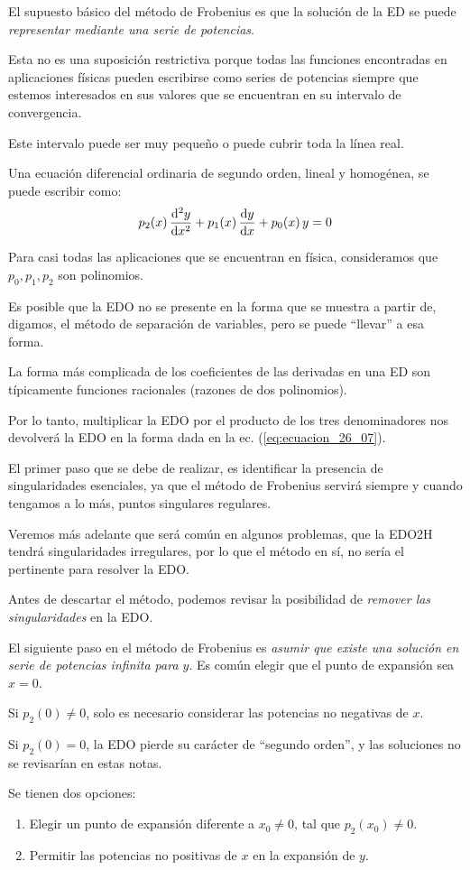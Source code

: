 El supuesto básico del método de Frobenius es que la solución de la ED se puede \emph{representar mediante una serie de potencias}.
\par
Esta no es una suposición restrictiva porque todas las funciones encontradas en aplicaciones físicas pueden escribirse como series de potencias siempre que estemos interesados en sus valores que se encuentran en su intervalo de convergencia.
\par
Este intervalo puede ser muy pequeño o puede cubrir toda la línea real.
\par
Una ecuación diferencial ordinaria de segundo orden, lineal y  homogénea, se puede escribir como:
\begin{align}
p_{2} (x) \, \dv[2]{y}{x} + p_{1} (x) \, \dv{y}{x} + p_{0}(x) \, y = 0
\label{eq:ecuacion_26_07}    
\end{align}

Para casi todas las aplicaciones que se encuentran en física, consideramos que $p_{0}, p_{1}, p_{2}$ son polinomios.
\par
Es posible que la EDO no se presente en la forma que se muestra a partir de, digamos, el método de separación de variables, pero se puede \enquote{llevar} a esa forma.
\par
La forma más complicada de los coeficientes de las derivadas en una ED son típicamente funciones racionales (razones de dos polinomios).
\par
Por lo tanto, multiplicar la EDO por el producto de los tres denominadores nos devolverá la EDO en la forma dada en la ec. (\ref{eq:ecuacion_26_07}).
\par
El primer paso que se debe de realizar, es identificar la presencia de singularidades esenciales, ya que el método de Frobenius servirá siempre y cuando tengamos a lo más, puntos singulares regulares.
\par
Veremos más adelante que será común en algunos problemas, que la EDO2H tendrá singularidades irregulares, por lo que el método en sí, no sería el pertinente para resolver la EDO.
\par
Antes de descartar el método, podemos revisar la posibilidad de \emph{remover las singularidades} en la EDO.
\par
El siguiente paso en el método de Frobenius es \emph{asumir que existe una solución en serie de potencias infinita para $y$}. Es común elegir que el punto de expansión sea $x = 0$.
\par
Si $p_{2} (0) \neq 0$, solo es necesario considerar las potencias no negativas de $x$.
\par
Si $p_{2} (0) = 0$, la EDO pierde su carácter de \enquote{segundo orden}, y las soluciones no se revisarían en estas notas.
\par
Se tienen dos opciones:
\begin{enumerate}
\item Elegir un punto de expansión diferente a $x_{0} \neq 0$, tal que $p_{2} (x_{0}) \neq 0$.
\item Permitir las potencias no positivas de $x$ en la expansión de $y$.
\end{enumerate}


